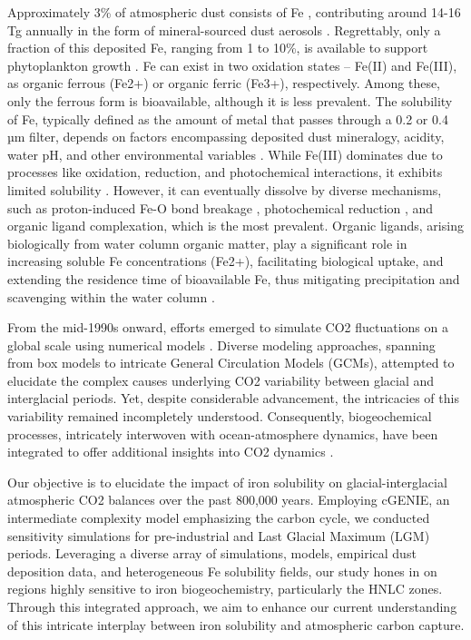 Approximately 3\% of atmospheric dust consists of Fe \citep{marcotte2020mineral}, contributing around 14-16 Tg annually in the form of mineral-sourced dust aerosols \citep{jickells2005global,gao2003aeolian}. Regrettably, only a fraction of this deposited Fe, ranging from 1 to 10\%, is available to support phytoplankton growth \citep{journet2008mineralogy,jickells2001atmospheric,archer2000model,bopp2003dust}. Fe can exist in two oxidation states – Fe(II) and Fe(III), as organic ferrous (Fe2+) or organic ferric (Fe3+), respectively. Among these, only the ferrous form is bioavailable, although it is less prevalent. The solubility of Fe, typically defined as the amount of metal that passes through a 0.2 or 0.4 µm filter, depends on factors encompassing deposited dust mineralogy, acidity, water pH, and other environmental variables \citep{luo2005estimation,sholkovitz2012fractional,marcotte2020mineral}. While Fe(III) dominates due to processes like oxidation, reduction, and photochemical interactions, it exhibits limited solubility \citep{wells1995iron,byrne2000iron}. However, it can eventually dissolve by diverse mechanisms, such as proton-induced Fe-O bond breakage \citep{cwiertny2008characterization}, photochemical reduction \citep{fu2010photoreductive}, and organic ligand complexation, which is the most prevalent. Organic ligands, arising biologically from water column organic matter, play a significant role in increasing soluble Fe concentrations (Fe2+), facilitating biological uptake, and extending the residence time of bioavailable Fe, thus mitigating precipitation and scavenging within the water column \citep{baker2010atmospheric}.

From the mid-1990s onward, efforts emerged to simulate CO2 fluctuations on a global scale using numerical models \citep{johnson1997controls}. Diverse modeling approaches, spanning from box models to intricate General Circulation Models (GCMs), attempted to elucidate the complex causes underlying CO2 variability between glacial and interglacial periods. Yet, despite considerable advancement, the intricacies of this variability remained incompletely understood. Consequently, biogeochemical processes, intricately interwoven with ocean-atmosphere dynamics, have been integrated to offer additional insights into CO2 dynamics \citep{flato2014evaluation}.

Our objective is to elucidate the impact of iron solubility on glacial-interglacial atmospheric CO2 balances over the past 800,000 years. Employing cGENIE, an intermediate complexity model emphasizing the carbon cycle, we conducted sensitivity simulations for pre-industrial and Last Glacial Maximum (LGM) periods. Leveraging a diverse array of simulations, models, empirical dust deposition data, and heterogeneous Fe solubility fields, our study hones in on regions highly sensitive to iron biogeochemistry, particularly the HNLC zones. Through this integrated approach, we aim to enhance our current understanding of this intricate interplay between iron solubility and atmospheric carbon capture.


